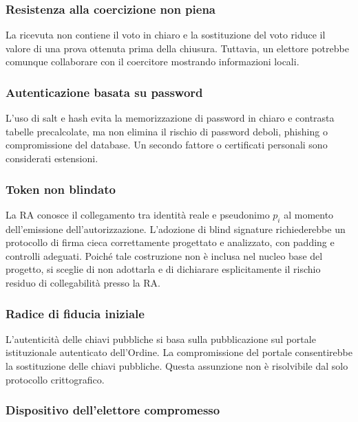 \documentclass[12pt,a4paper]{article}
\begin{document}
\subsubsection*{Resistenza alla coercizione non piena}

La ricevuta non contiene il voto in chiaro e la sostituzione del voto riduce il valore di una prova ottenuta prima della chiusura. Tuttavia, un elettore potrebbe comunque collaborare con il coercitore mostrando informazioni locali.

\subsubsection*{Autenticazione basata su password}

L'uso di salt e hash evita la memorizzazione di password in chiaro e contrasta tabelle precalcolate, ma non elimina il rischio di password deboli, phishing o compromissione del database. Un secondo fattore o certificati personali sono considerati estensioni.

\subsubsection*{Token non blindato}

La RA conosce il collegamento tra identit\`a reale e pseudonimo $p_i$
al momento dell'emissione dell'autorizzazione. L'adozione di blind signature richiederebbe un protocollo di firma cieca correttamente progettato e analizzato, con padding e controlli adeguati. Poich\'e tale costruzione non \`e inclusa nel nucleo base del progetto, si sceglie di non adottarla e di dichiarare esplicitamente il rischio residuo di collegabilit\`a presso la RA. 

\subsubsection*{Radice di fiducia iniziale}

L'autenticit\`a delle chiavi pubbliche si basa sulla pubblicazione
sul portale istituzionale autenticato dell'Ordine. La compromissione
del portale consentirebbe la sostituzione delle chiavi pubbliche.
Questa assunzione non \`e risolvibile dal solo protocollo crittografico.

\subsubsection*{Dispositivo dell'elettore compromesso}
\end{document}
